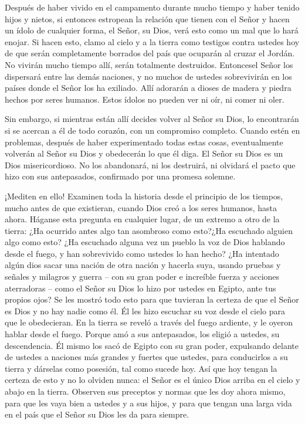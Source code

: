  Después de haber vivido en el campamento durante mucho
tiempo y haber tenido hijos y nietos, si entonces estropean la relación
que tienen con el Señor y hacen un ídolo de cualquier forma, el Señor,
su Dios, verá esto como un mal que lo hará enojar.  Si
hacen esto, clamo al cielo y a la tierra como testigos contra ustedes
hoy de que serán completamente borrados del país que ocuparán al cruzar
el Jordán. No vivirán mucho tiempo allí, serán totalmente destruidos.
 Entoncesel Señor los dispersará entre las demás naciones,
y no muchos de ustedes sobrevivirán en los países donde el Señor los ha
exiliado.  Allí adorarán a dioses de madera y piedra hechos
por seres humanos. Estos ídolos no pueden ver ni oír, ni comer ni oler.

 Sin embargo, si mientras están allí decides volver al
Señor su Dios, lo encontrarán si se acercan a él de todo corazón, con un
compromiso completo.  Cuando estén en problemas, después de
haber experimentado todas estas cosas, eventualmente volverán al Señor
su Dios y obedecerán lo que él diga.  El Señor su Dios es
un Dios misericordioso. No los abandonará, ni los destruirá, ni olvidará
el pacto que hizo con sus antepasados, confirmado por una promesa
solemne.

 ¡Mediten en ello! Examinen toda la historia desde el
principio de los tiempos, mucho antes de que existieran, cuando Dios
creó a los seres humanos, hasta ahora. Háganse esta pregunta en
cualquier lugar, de un extremo a otro de la tierra: ¿Ha ocurrido antes
algo tan asombroso como esto?¿Ha escuchado alguien algo como esto?
 ¿Ha escuchado alguna vez un pueblo la voz de Dios hablando
desde el fuego, y han sobrevivido como ustedes lo han hecho?
 ¿Ha intentado algún dios sacar una nación de otra nación y
hacerla suya, usando pruebas y señales y milagros y guerra -- con su
gran poder e increíble fuerza y acciones aterradoras -- como el Señor su
Dios lo hizo por ustedes en Egipto, ante tus propios ojos? 
Se les mostró todo esto para que tuvieran la certeza de que el Señor es
Dios y no hay nadie como él.  Él les hizo escuchar su voz
desde el cielo para que le obedecieran. En la tierra se reveló a través
del fuego ardiente, y le oyeron hablar desde el fuego. 
Porque amó a sus antepasados, los eligió a ustedes, su descendencia. Él
mismo los sacó de Egipto con su gran poder,  expulsando
delante de ustedes a naciones más grandes y fuertes que ustedes, para
conducirlos a su tierra y dárselas como posesión, tal como sucede hoy.
 Así que hoy tengan la certeza de esto y no lo olviden
nunca: el Señor es el único Dios arriba en el cielo y abajo en la
tierra.  Observen sus preceptos y normas que les doy ahora
mismo, para que les vaya bien a ustedes y a sus hijos, y para que tengan
una larga vida en el país que el Señor su Dios les da para siempre.

